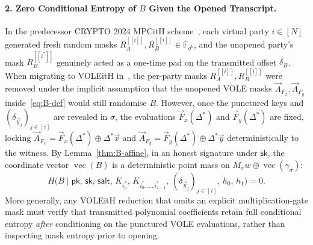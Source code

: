 \documentclass[11pt,a4paper]{article}
\theoremstyle{definition}
\theoremstyle{remark}
\newcommand{\Fqk}{\mathbb{F}_{q^k}}
\newcommand{\pk}{\mathsf{pk}}
\newcommand{\sk}{\mathsf{sk}}
\newcommand{\salt}{\mathsf{salt}}
\newcommand{\vecF}{\operatorname{vec}}
\newcommand{\share}[1]{[\![#1]\!]}
\begin{document}
\paragraph{2. Zero Conditional Entropy of $B$ Given the Opened Transcript.}
In the predecessor CRYPTO 2024 MPCitH scheme~\cite{HJ24}, each virtual party $i \in [N]$ generated fresh random masks $R_A^{\share{i}}, R_B^{\share{i}} \in \Fqk$, and the unopened party's mask $R_B^{\share{i^*}}$ genuinely acted as a one-time pad on the transmitted offset $\delta_B$. When migrating to VOLEitH in~\cite{HJ25}, the per-party masks $R_A^{\share{i}}, R_B^{\share{i}}$ were removed under the implicit assumption that the unopened VOLE masks $\vec{A}_{F_x}, \vec{A}_{F_y}$ inside~\eqref{eq:B-def} would still randomise $B$. However, once the punctured keys and $(\delta_{\vec{y}_j})_{j \in [\tau]}$ are revealed in $\sigma$, the evaluations $\vec{F}_x(\Delta^*)$ and $\vec{F}_y(\Delta^*)$ are fixed, locking $\vec{A}_{F_x} = \vec{F}_x(\Delta^*) \oplus \Delta^*\vec{x}$ and $\vec{A}_{F_y} = \vec{F}_y(\Delta^*) \oplus \Delta^*\vec{y}$ deterministically to the witness. By Lemma~\ref{thm:B-affine}, in an honest signature under $\sk$, the coordinate vector $\vecF(B)$ is a deterministic point mass on $M_\sigma w \oplus \vecF(\gamma_\sigma)$:
\begin{equation}
\label{eq:zero-entropy}
H\Big(B \;\Big|\; \pk, \, \sk, \, \salt, \, K_{i^*_{\text{p}}}, \, K_{i^*_0, \dots, i^*_{\tau-1}}, \, (\delta_{\vec{y}_j})_{j \in [\tau]}, \, h_0, \, h_1\Big) = 0.
\end{equation}
More generally, any VOLEitH reduction that omits an explicit multiplication-gate mask must verify that transmitted polynomial coefficients retain full conditional entropy \emph{after} conditioning on the punctured VOLE evaluations, rather than inspecting mask entropy prior to opening.
\end{document}
